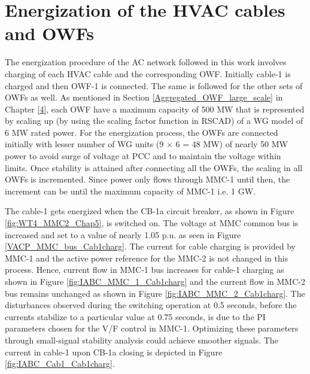 \section{Energization of the HVAC cables and OWFs}\label{energization_HVAC_Cables}
The energization procedure of the \gls{AC} network followed in this work involves charging of each \gls{HVAC} cable and the corresponding \gls{OWF}. Initially cable-1 is charged and then \gls{OWF}-1 is connected. The same is followed for the other sets of \gls{OWF}s as well. As mentioned in Section \ref{Aggregated_OWF_large_scale} in Chapter \ref{4}, each \gls{OWF} have a maximum capacity of 500 MW that is represented by scaling up (by using the scaling factor function in RSCAD) of a \gls{WG} model of 6 MW rated power. For the energization process, the \gls{OWF}s are connected initially with lesser number of \gls{WG} units (9 $\times$ 6 = 48 MW) of nearly 50 MW power to avoid surge of voltage at \gls{PCC} and to maintain the voltage within limits. Once stability is attained after connecting all the \gls{OWF}s, the scaling in all \gls{OWF}s is incremented. Since power only flows through \gls{MMC}-1 until then, the increment can be until the maximum capacity of \gls{MMC}-1 i.e. 1 GW.

The cable-1 gets energized when the CB-1a circuit breaker, as shown in Figure \ref{fig:WT4_MMC2_Chap5}, is switched on. The voltage at \gls{MMC} common bus is increased and set to a value of nearly 1.05 p.u. as seen in Figure \ref{VACP_MMC_bus_Cab1charg}. The current for cable charging is provided by \gls{MMC}-1 and the active power reference for the \gls{MMC}-2 is not changed in this process. Hence, current flow in \gls{MMC}-1 bus increases for cable-1 charging as shown in Figure \ref{fig:IABC_MMC_1_Cab1charg} and the current flow in \gls{MMC}-2 bus remains unchanged as shown in Figure \ref{fig:IABC_MMC_2_Cab1charg}. The disturbances observed during the switching operation at 0.5 seconds, before the currents stabilize to a particular value at 0.75 seconds, is due to the \gls{PI} parameters chosen for the V/F control in \gls{MMC}-1. Optimizing these parameters through small-signal stability analysis could achieve smoother signals. The current in cable-1 upon CB-1a closing is depicted in Figure \ref{fig:IABC_Cab1_Cab1charg}. 


